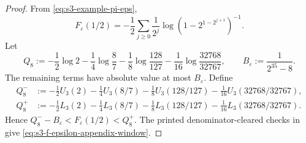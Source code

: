\begin{proof}
  From \eqref{eq:s3-example-pi-eps},
  \[
    F_\varepsilon(1/2)
    =-\frac12\sum_{j\ge0}\frac{1}{2^j}
      \log\left(1-2^{1-2^{j+1}}\right)^{-1}.
  \]
  Let
  \[
    Q_8:=-\frac12\log2-\frac14\log\frac87
      -\frac18\log\frac{128}{127}
      -\frac1{16}\log\frac{32768}{32767},
    \qquad
    B_\varepsilon:=\frac1{2^{35}-8}.
  \]
  The remaining terms have absolute value at most \(B_\varepsilon\).  Define
  \begin{equation}\label{eq:s3-q8-endpoint-values}
  \begin{aligned}
    Q_8^- &:=-\frac12U_3(2)-\frac14U_3(8/7)
      -\frac18U_3(128/127)-\frac1{16}U_3(32768/32767),\\
    Q_8^+ &:=-\frac12L_3(2)-\frac14L_3(8/7)
      -\frac18L_3(128/127)-\frac1{16}L_3(32768/32767).
  \end{aligned}
  \end{equation}
  Hence \(Q_8^- -B_\varepsilon<F_\varepsilon(1/2)<Q_8^+\).
  The printed denominator-cleared checks in
   give
  \eqref{eq:s3-f-epsilon-appendix-window}.


\end{proof}
